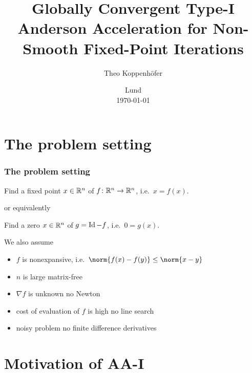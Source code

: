 %




\subject{, VT23}
\title{%
Globally Convergent Type-I Anderson Acceleration for Non-Smooth Fixed-Point Iterations}
\author{Theo Koppenhöfer}
\date{Lund \\[1ex] \today}








\frame[plain]



\frame[plain]{\titlepage}


\section{The problem setting}
\begin{frame}
	\frametitle{The problem setting}
	\begin{problem}
		Find a fixed point $x\in\mathbb{R}^n$ of $f\colon\mathbb{R}^n\to\mathbb{R}^n$, i.e.\ $x=f(x)$.
	\end{problem}
	or equivalently
	\begin{problem}
		Find a zero $x\in\mathbb{R}^n$ of $g=\operatorname{Id}-f$, i.e.\ $0=g(x)$.
	\end{problem}
	We also assume
	\begin{itemize}
		\item $f$ is nonexpansive, i.e.\ $\norm{f(x)-f(y)}\leq\norm{x-y}$
		\item $n$ is large \textrightarrow matrix-free
		\item $\nabla f$ is unknown \textrightarrow no Newton
		\item cost of evaluation of $f$ is high \textrightarrow no line search
		\item noisy problem \textrightarrow no finite difference derivatives
	\end{itemize}
\end{frame}

\section{Motivation of AA-I}
